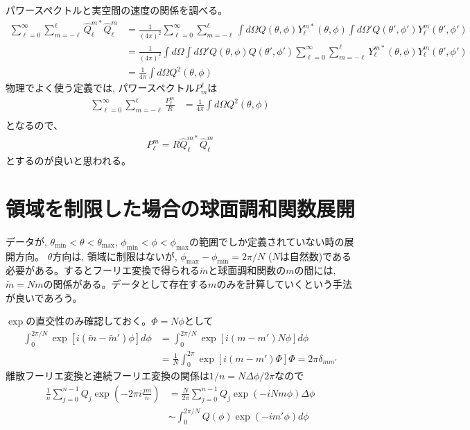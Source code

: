 \documentclass[a4j, 12pt]{ltjarticle}
\begin{document}
    パワースペクトルと実空間の速度の関係を調べる。
    \begin{align}
        \sum_{\ell=0}^\infty\sum_{m=-\ell}^\ell
        \widehat{Q}_\ell^{m*} \widehat{Q}_\ell^m
        &= \frac{1}{(4\pi)^2}\sum_{\ell=0}^\infty\sum_{m=-\ell}^\ell
        \int d\Omega Q(\theta,\phi) Y_\ell^{m*}(\theta,\phi)
        \int d\Omega' Q(\theta',\phi') Y_\ell^m(\theta',\phi') \\
        & = \frac{1}{(4\pi)^2}\int d\Omega \int d\Omega' Q(\theta,\phi)Q(\theta',\phi')
        \sum_{\ell=0}^\infty\sum_{m=-\ell}^\ell Y_\ell^{m*}(\theta,\phi)Y_\ell^m(\theta',\phi') \\
        & = \frac{1}{4\pi}\int d\Omega Q^2(\theta,\phi)
    \end{align}
    物理でよく使う定義では, パワースペクトル$P_m^\ell$は
    \begin{align}
        \sum_{\ell =0}^\infty \sum_{m=-\ell}^\ell \frac{P_\ell^m}{R}
        &= \frac{1}{4\pi}\int d\Omega Q^2(\theta,\phi) \\
    \end{align}
    となるので、 
    \begin{align}
        P_\ell^m = R\widehat{Q}_\ell^{m*}\widehat{Q}_\ell^m
    \end{align}
    とするのが良いと思われる。
    \section{領域を制限した場合の球面調和関数展開}
    データが, $\theta_\mathrm{min}<\theta<\theta_\mathrm{max}$, $\phi_\mathrm{min}<\phi<\phi_\mathrm{max}$の範囲でしか定義されていない時の展開方向。
    $\theta$方向は, 領域に制限はないが, $\phi_\mathrm{max}-\phi_\mathrm{min}=2\pi/N$ ($N$は自然数)である必要がある。するとフーリエ変換で得られる$\tilde{m}$と球面調和関数の$m$の間には, $\tilde{m}=Nm$の関係がある。データとして存在する$m$のみを計算していくという手法が良いであろう。\par
    $\exp$の直交性のみ確認しておく。$\Phi = N\phi$として
    \begin{align}
        \int_0^{2\pi/N} \exp[i(\tilde{m}-\tilde{m}')\phi]d\phi
        &= \int_0^{2\pi/N} \exp[i(m-m')N\phi]d\phi \\
        &= \frac{1}{N}\int_0^{2\pi} \exp[i(m-m')\Phi] \Phi = 2\pi \delta_{mm'}        
    \end{align}
    離散フーリエ変換と連続フーリエ変換の関係は$1/n=N\Delta \phi/2\pi$なので
    \begin{align}
        \frac{1}{n}\sum_{j=0}^{n-1}Q_j \exp\left(-2\pi i \frac{jm}{n}\right)
        &= \frac{N}{2\pi}\sum_{j=0}^{n-1}Q_j\exp\left(-iNm\phi \right) \Delta \phi \\
        &\sim \int_0^{2\pi/N} Q(\phi) \exp(-im'\phi)d\phi
    \end{align}    
    \appendix
\end{document}

